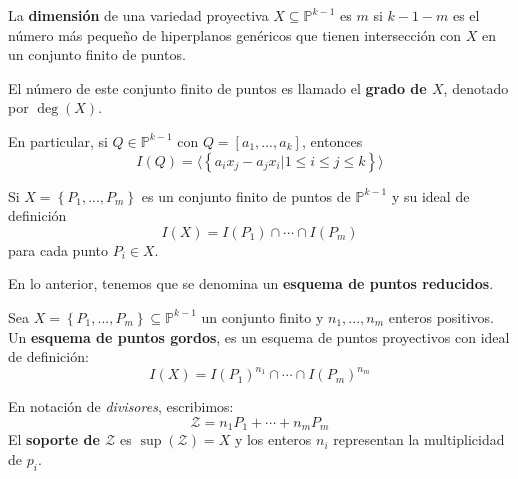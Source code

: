 \documentclass[12pt]{report}
\newcounter{it}
\theoremstyle{largebreak}
\begin{document}
    \begin{mydef}
        La \textbf{dimensión} de una variedad proyectiva $X\subseteq\mathbb{P}^{ k-1}$ es $m$ si $k-1-m$ es el número más pequeño de hiperplanos genéricos que tienen intersección con $X$ en un conjunto finito de puntos.

        El número de este conjunto finito de puntos es llamado el \textbf{grado de $X$}, denotado por $\deg(X)$.
    \end{mydef}

    \begin{exa}
        En particular, si $Q\in\mathbb{P}^{ k-1}$ con $Q=[a_1,...,a_k]$, entonces
        \begin{equation*}
            I(Q)=\langle\left\{a_ix_j-a_jx_i\Big|1\leq i\leq j\leq k \right\} \rangle
        \end{equation*}
    \end{exa}

    Si $X=\left\{P_1,...,P_m \right\}$ es un conjunto finito de puntos de $\mathbb{P}^{ k-1}$ y su ideal de definición
    \begin{equation*}
        I(X)=I(P_1)\cap\cdots\cap I(P_m) 
    \end{equation*}
    para cada punto $P_i\in X$.

    \begin{mydef}
        En lo anterior, tenemos que se denomina un \textbf{esquema de puntos reducidos}.
    \end{mydef}

    \begin{mydef}
        Sea $X=\left\{P_1,...,P_m \right\}\subseteq\mathbb{P}^{ k-1}$ un conjunto finito y $n_1,...,n_m$ enteros positivos. Un \textbf{esquema de puntos gordos}, es un esquema de puntos proyectivos con ideal de definición:
        \begin{equation*}
            I(X)=I(P_1)^{ n_1}\cap\cdots\cap I(P_m)^{ n_m}
        \end{equation*}
    \end{mydef}

    \begin{obs}
        En notación de \textit{divisores}, escribimos:
        \begin{equation*}
            \mathcal{Z}=n_1P_1+\cdots+n_mP_m
        \end{equation*}
        El \textbf{soporte de $\mathcal{Z}$} es $\sup\left(\mathcal{Z} \right)=X$ y los enteros $n_i$ representan la multiplicidad de $p_i$.
    \end{obs}
\end{document}
